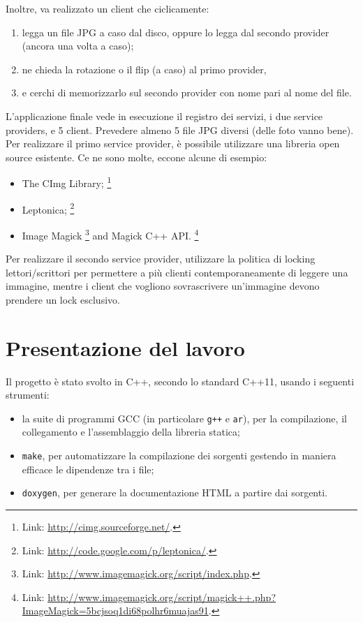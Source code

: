 \documentclass[a4paper,twoside]{article}
\newcommand*\file{\texttt}
\begin{document}
Inoltre, va realizzato un client che ciclicamente:
\begin{enumerate}
\item legga un file JPG a caso dal disco, oppure lo legga dal secondo provider (ancora una volta a caso);
\item ne chieda la rotazione o il flip (a caso) al primo provider,
\item e cerchi di memorizzarlo sul secondo provider con nome pari al nome del file.
\end{enumerate}

L'applicazione finale vede in esecuzione il registro dei servizi, i due service providers, e 5 client. Prevedere almeno 5 file JPG diversi (delle foto vanno bene).
Per realizzare il primo service provider, è possibile utilizzare una libreria open source esistente. Ce ne sono molte, eccone alcune di esempio:
\begin{itemize}
\item The CImg Library;%
  \footnote{Link: \url{http://cimg.sourceforge.net/}.}
\item Leptonica;%
  \footnote{Link: \url{http://code.google.com/p/leptonica/}.}
\item Image Magick%
  \footnote{Link: \url{http://www.imagemagick.org/script/index.php}.}
  and Magick C++ API.%
  \footnote{Link: \url{http://www.imagemagick.org/script/magick++.php?ImageMagick=5bcjsoq1di68polhr6muajas91}.}
\end{itemize}
Per realizzare il secondo service provider, utilizzare la politica di locking lettori/scrittori per permettere a più clienti contemporaneamente di leggere una immagine, mentre i client che vogliono sovrascrivere un'immagine devono prendere un lock esclusivo.
\endgroup
\clearpage


\section{Presentazione del lavoro}

Il progetto è stato svolto in C++, secondo lo standard C++11, usando i seguenti strumenti:
\begin{itemize}
\item la suite di programmi GCC (in particolare \file{g++} e \file{ar}), per la compilazione, il collegamento e l'assemblaggio della libreria statica;
\item \file{make}, per automatizzare la compilazione dei sorgenti gestendo in maniera efficace le dipendenze tra i file;
\item \file{doxygen}, per generare la documentazione HTML a partire dai sorgenti.
\end{itemize}
\end{document}
